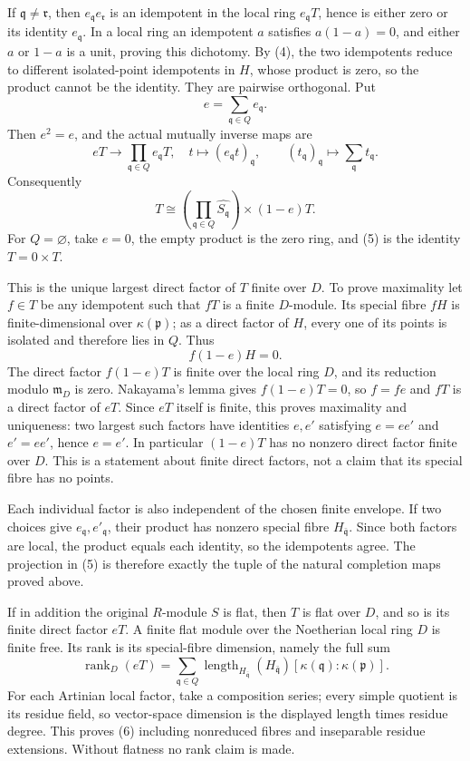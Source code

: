 If \(\mathfrak q\ne\mathfrak r\), then \(e_{\mathfrak q}e_{\mathfrak r}\) is an idempotent in the local ring \(e_{\mathfrak q}T\), hence is either zero or its identity \(e_{\mathfrak q}\). In a local ring an idempotent \(a\) satisfies \(a(1-a)=0\), and either \(a\) or \(1-a\) is a unit, proving this dichotomy. By (4), the two idempotents reduce to different isolated-point idempotents in \(H\), whose product is zero, so the product cannot be the identity. They are pairwise orthogonal. Put \[
 e=\sum_{\mathfrak q\in Q}e_{\mathfrak q}.
\] Then \(e^2=e\), and the actual mutually inverse maps are \[
 eT\longrightarrow\prod_{\mathfrak q\in Q}e_{\mathfrak q}T,\quad
 t\longmapsto(e_{\mathfrak q}t)_{\mathfrak q},
 \qquad
 (t_{\mathfrak q})_{\mathfrak q}\longmapsto\sum_{\mathfrak q}t_{\mathfrak q}.
\] Consequently \[
 T\cong
 \left(\prod_{\mathfrak q\in Q}\widehat{S_{\mathfrak q}}\right)
 \times(1-e)T.
 \tag{5}
\] For \(Q=\varnothing\), take \(e=0\), the empty product is the zero ring, and (5) is the identity \(T=0\times T\).

This is the unique largest direct factor of \(T\) finite over \(D\). To prove maximality let \(f\in T\) be any idempotent such that \(fT\) is a finite \(D\)-module. Its special fibre \(fH\) is finite-dimensional over \(\kappa(\mathfrak p)\); as a direct factor of \(H\), every one of its points is isolated and therefore lies in \(Q\). Thus \[
 f(1-e)H=0.
\] The direct factor \(f(1-e)T\) is finite over the local ring \(D\), and its reduction modulo \(\mathfrak m_D\) is zero. Nakayama's lemma gives \(f(1-e)T=0\), so \(f=fe\) and \(fT\) is a direct factor of \(eT\). Since \(eT\) itself is finite, this proves maximality and uniqueness: two largest such factors have identities \(e,e'\) satisfying \(e=ee'\) and \(e'=ee'\), hence \(e=e'\). In particular \((1-e)T\) has no nonzero direct factor finite over \(D\). This is a statement about finite direct factors, not a claim that its special fibre has no points.

Each individual factor is also independent of the chosen finite envelope. If two choices give \(e_{\mathfrak q},e'_{\mathfrak q}\), their product has nonzero special fibre \(H_{\bar{\mathfrak q}}\). Since both factors are local, the product equals each identity, so the idempotents agree. The projection in (5) is therefore exactly the tuple of the natural completion maps proved above.

If in addition the original \(R\)-module \(S\) is flat, then \(T\) is flat over \(D\), and so is its finite direct factor \(eT\). A finite flat module over the Noetherian local ring \(D\) is finite free. Its rank is its special-fibre dimension, namely the full sum \[
 \operatorname{rank}_D(eT)
 =
 \sum_{\mathfrak q\in Q}
   \operatorname{length}_{H_{\bar{\mathfrak q}}}
                         (H_{\bar{\mathfrak q}})
   [\kappa(\mathfrak q):\kappa(\mathfrak p)].
 \tag{6}
\] For each Artinian local factor, take a composition series; every simple quotient is its residue field, so vector-space dimension is the displayed length times residue degree. This proves (6) including nonreduced fibres and inseparable residue extensions. Without flatness no rank claim is made.

